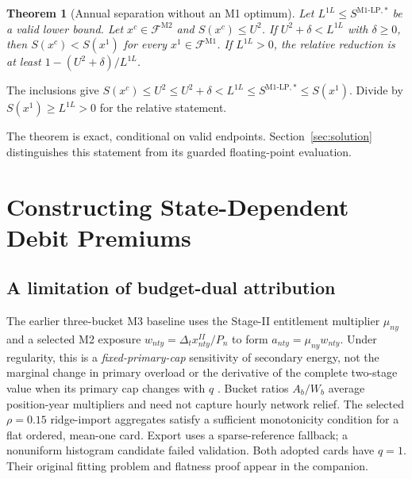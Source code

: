 \documentclass[10pt,journal]{IEEEtran}
\newtheorem{theorem}{Theorem}
\newcommand{\Mone}{\mathrm{M1}}
\newcommand{\Mtwo}{\mathrm{M2}}
\newcommand{\Mlp}{\mathrm{M1\text{-}LP}}
\newcommand{\F}{\mathcal F}
\begin{document}
\begin{theorem}[Annual separation without an M1 optimum]
\label{thm:separation}
Let $L^{1L}\leq S^{\Mlp,*}$ be a valid lower bound. Let $x^c\in\F^{\Mtwo}$ and $S(x^c)\leq U^2$. If $U^2+\delta<L^{1L}$ with $\delta\geq0$, then $S(x^c)<S(x^1)$ for every $x^1\in\F^{\Mone}$. If $L^{1L}>0$, the relative reduction is at least $1-(U^2+\delta)/L^{1L}$.
\end{theorem}
\begin{IEEEproof}
The inclusions give
$S(x^c)\leq U^2\leq U^2+\delta<L^{1L}\leq S^{\Mlp,*}\leq S(x^1)$.
Divide by $S(x^1)\geq L^{1L}>0$ for the relative statement.
\end{IEEEproof}
The theorem is exact, conditional on valid endpoints. Section~\ref{sec:solution} distinguishes this statement from its guarded floating-point evaluation.

\section{Constructing State-Dependent Debit Premiums}
\label{sec:design}
\subsection{A limitation of budget-dual attribution}
The earlier three-bucket M3 baseline uses the Stage-II entitlement multiplier $\mu_{ny}$ and a selected M2 exposure $w_{nty}=\Delta_t x^{II}_{nty}/P_n$ to form $a_{nty}=\mu_{ny}w_{nty}$. Under regularity, this is a \emph{fixed-primary-cap} sensitivity of secondary energy, not the marginal change in primary overload or the derivative of the complete two-stage value when its primary cap changes with $q$ \cite{BonnansShapiro2000}. Bucket ratios $A_b/W_b$ average position-year multipliers and need not capture hourly network relief. The selected $\rho=0.15$ ridge-import aggregates satisfy a sufficient monotonicity condition for a flat ordered, mean-one card. Export uses a sparse-reference fallback; a nonuniform histogram candidate failed validation. Both adopted cards have $q=1$. Their original fitting problem and flatness proof appear in the companion.
\end{document}
